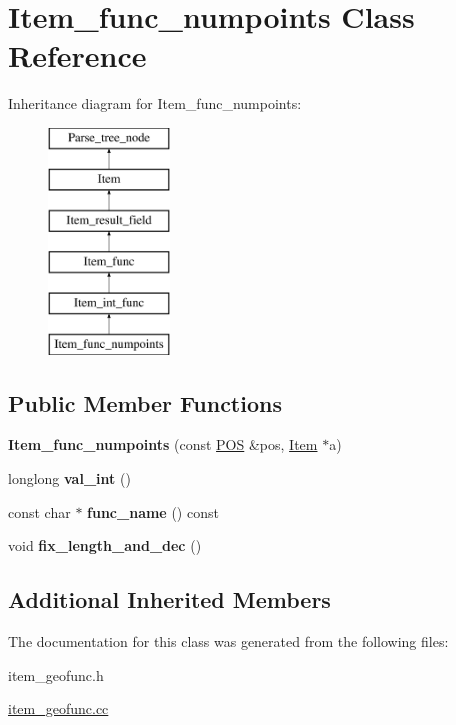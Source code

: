 \hypertarget{classItem__func__numpoints}{}\section{Item\+\_\+func\+\_\+numpoints Class Reference}
\label{classItem__func__numpoints}
Inheritance diagram for Item\+\_\+func\+\_\+numpoints\+:\begin{figure}[H]
\begin{center}
\leavevmode
\includegraphics[height=6.000000cm]{classItem__func__numpoints}
\end{center}
\end{figure}
\subsection*{Public Member Functions}
\begin{DoxyCompactItemize}
\item 
\mbox{\label{classItem__func__numpoints_ac06e7d4878196378b6b31dc2c9bd9b7b}} 
{\bfseries Item\+\_\+func\+\_\+numpoints} (const \mbox{\hyperlink{structYYLTYPE}{P\+OS}} \&pos, \mbox{\hyperlink{classItem}{Item}} $\ast$a)
\item 
\mbox{\label{classItem__func__numpoints_ac5b85b5ac741c31e8dcf3164081d4520}} 
longlong {\bfseries val\+\_\+int} ()
\item 
\mbox{\label{classItem__func__numpoints_a614149294c9f0e4b176b926f78cf7343}} 
const char $\ast$ {\bfseries func\+\_\+name} () const
\item 
\mbox{\label{classItem__func__numpoints_af32320e6f280bed5b01ab58355c611e6}} 
void {\bfseries fix\+\_\+length\+\_\+and\+\_\+dec} ()
\end{DoxyCompactItemize}
\subsection*{Additional Inherited Members}


The documentation for this class was generated from the following files\+:\begin{DoxyCompactItemize}
\item 
item\+\_\+geofunc.\+h\item 
\mbox{\hyperlink{item__geofunc_8cc}{item\+\_\+geofunc.\+cc}}\end{DoxyCompactItemize}
